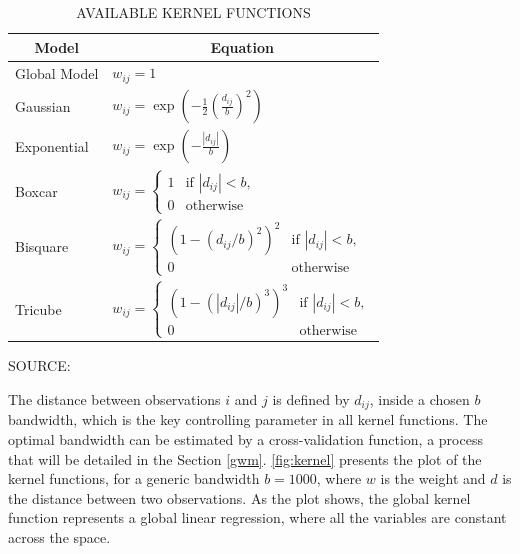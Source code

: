 \begin{table}[!hbtp]
    \footnotesize
    \captionsetup{justification=raggedright,
        singlelinecheck=false,
        font=footnotesize}
    \caption{AVAILABLE KERNEL FUNCTIONS}
    \centering
    \begin{tabular}{ll}
        \hline
        \multicolumn{1}{c}{\textbf{Model}} & \multicolumn{1}{c}{\textbf{Equation}}  \\
        \hline
        Global Model             & $w_{ij} = 1$                              \\
        Gaussian \rule{0pt}{3ex} & $w_{ij} = \exp (- \frac{1}{2} (\frac{d_{ij}}{b})^2)$ \\
        Exponential  \rule{0pt}{4ex} & $w_{ij} = \exp (- \frac{|d_{ij}|}{b})$               \\
        Boxcar \rule{0pt}{4ex} & $w_{ij} = \begin{cases}
            1 & \mbox{if } |d_{ij}| < b, \\
            0 & \mbox{otherwise}
                                 \end{cases}$                               \\
        Bisquare \rule{0pt}{4ex} & $w_{ij} = \begin{cases}
            (1 - (d_{ij}/b)^2)^2 & \mbox{if } |d_{ij}| < b, \\
            0 & \mbox{otherwise}
                                 \end{cases}$                               \\
        Tricube \rule{0pt}{4ex} & $w_{ij} = \begin{cases}
            (1 - (|d_{ij}|/b)^3)^3 & \mbox{if } |d_{ij}| < b, \\
            0 & \mbox{otherwise}
                                 \end{cases}$                               \\
        \hline
        \end{tabular}
    \label{tab:kernel}
    \par \vspace{2mm} \footnotesize \raggedright
    SOURCE: \textcite{Gollini2013}
\end{table}

The distance between observations $i$ and $j$ is defined by $d_{ij}$, inside a chosen $b$ bandwidth, which is the key controlling parameter in all kernel functions. The optimal bandwidth can be estimated by a cross-validation function, a process that will be detailed in the Section \ref{gwm}. \autoref{fig:kernel} presents the plot of the kernel functions, for a generic bandwidth $b = 1000$, where $w$ is the weight and $d$ is the distance between two observations. As the plot shows, the global kernel function represents a global linear regression, where all the variables are constant across the space.

